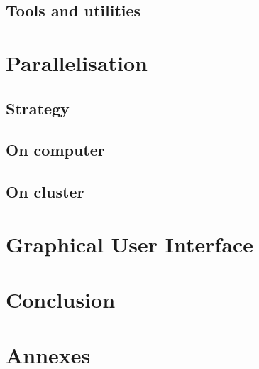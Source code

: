 \documentclass[12pt]{article}
\begin{document}
	\subsection{Tools and utilities}	\label{sec:tools}			

\newpage
\section{Parallelisation}			\label{sec:parallelisation}
	\subsection{Strategy}			\label{sec:strategy}			
	\subsection{On computer}		\label{sec:computer}			
	\subsection{On cluster}			\label{sec:cluster}			

\newpage
\section{Graphical User Interface}		\label{sec:gui}				

\newpage
	\section{Conclusion}			\label{sec:conclusion}			
\newpage


\newpage
	\section{Annexes}			\label{sec:annexes}			
\newpage



\end{document}
